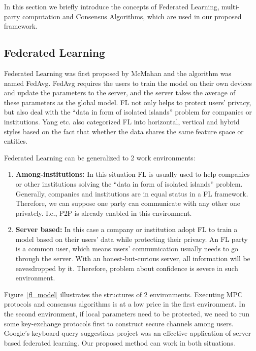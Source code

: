 In this section we briefly introduce the concepts of Federated Learning, multi-party computation and Consensus Algorithms, which are used in our proposed framework.

\subsection{Federated Learning}
Federated Learning was first proposed by McMahan and the algorithm was named FedAvg\cite{mcmahan2016communicationefficient}. FedAvg requires the users to train the model on their own devices and update the parameters to the server, and the server takes the average of these parameters as the global model. FL not only helps to protect users' privacy, but also deal with the ``data in form of isolated islands'' problem for companies or institutions. Yang etc. also categorized FL into horizontal, vertical and hybrid styles based on the fact that whether the data shares the same feature space or entities\cite{yang2019federated}. 

Federated Learning can be generalized to 2 work environments:

\begin{enumerate}

    \item \textbf{Among-institutions:} In this situation FL is usually used to help companies or other institutions solving the ``data in form of isolated islands'' problem. Generally, companies and institutions are in equal status in a FL framework. Therefore, we can suppose one party can communicate with any other one privately. I.e., P2P is already enabled in this environment.

    \item \textbf{Server based:} In this case a company or institution adopt FL to train a model based on their users' data while protecting their privacy. An FL party is a common user, which means users' communication usually needs to go through the server. With an honest-but-curious server, all information will be eavesdropped by it. Therefore, problem about confidence is severe in such environment.

\end{enumerate}

Figure~\ref{fl_model} illustrates the structures of 2 environments. Executing MPC protocols and consensus algorithms is at a low price in the first environment. In the second environment, if local parameters need to be protected, we need to run some key-exchange protocols first to construct secure channels among users. Google's keyboard query suggestions\cite{yang2018applied} project was an effective application of server based federated learning. Our proposed method can work in both situations.

